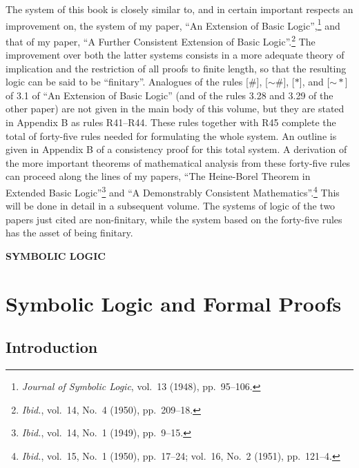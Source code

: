 \documentclass{book}
\renewcommand*{\neg}{\mathord{\sim}}
\begin{document}
The system of this book is closely similar to, and in certain important respects an improvement on, the system of my paper, “An Extension of Basic Logic”,\footnote{\textit{Journal of Symbolic Logic}, vol.\ 13 (1948), pp.\ 95–106.} and that of my paper, “A Further Consistent Extension of Basic Logic”.\footnote{\textit{Ibid.}, vol.\ 14, No.\ 4 (1950), pp.\ 209–18.}  The improvement over both the latter systems consists in a more adequate theory of implication and the restriction of all proofs to finite length, so that the resulting logic can be said to be “finitary”.  Analogues of the rules [\(\#\)], [\(\neg\#\)], [\(*\)], and [\(\neg *\)] of 3.1 of “An Extension of Basic Logic” (and of the rules 3.28 and 3.29 of the other paper) are not given in the main body of this volume, but they are stated in Appendix B as rules R41–R44.  These rules together with R45 complete the total of forty-five rules needed for formulating the whole system.  An outline is given in Appendix B of a consistency proof for this total system.  A derivation of the more important theorems of mathematical analysis from these forty-five rules can proceed along the lines of my papers, “The Heine-Borel Theorem in Extended Basic Logic”\footnote{\textit{Ibid.}, vol.\ 14, No.\ 1 (1949), pp.\ 9–15.} and “A Demonstrably Consistent Mathematics”.\footnote{\textit{Ibid.}, vol.\ 15, No.\ 1 (1950), pp.\ 17–24; vol.\ 16, No.\ 2 (1951), pp.\ 121–4.}  This will be done in detail in a subsequent volume.  The systems of logic of the two papers just cited are non-finitary, while the system based on the forty-five rules has the asset of being finitary.

\setcounter{tocdepth}{1}
\tableofcontents

\mainmatter
\pagestyle{headings}

\begin{center}
  \Large\bfseries\MakeUppercase{Symbolic Logic}
\end{center}

\thispagestyle{empty}
\clearpage
\thispagestyle{empty}
\cleardoublepage

\chapter{Symbolic Logic and Formal Proofs}
\label{chap:1}

\section{Introduction}
\label{sec:1}
\end{document}
